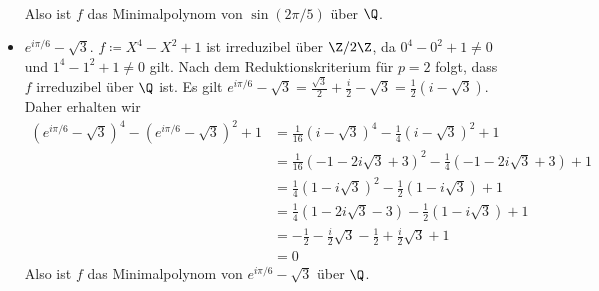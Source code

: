 \documentclass{article}
\begin{document}
\begin{itemize}
\begin{align*}
        \end{align*}
        Also ist $f$ das Minimalpolynom von $\sin(2\pi /5)$ über $\Q$.
        \item $e^{i\pi/6} - \sqrt{3}$. 
        $f \coloneqq X^4 - X^2 + 1$ ist irreduzibel über $\Z/2\Z$, da $0^4 - 0^2 + 1 \neq 0$ und $1^4 - 1^2 + 1 \neq 0$ gilt.
        Nach dem Reduktionskriterium für $p = 2$ folgt, dass $f$ irreduzibel über $\Q$ ist.
        Es gilt $e^{i\pi /6} - \sqrt{3} = \frac{\sqrt{3}}{2} + \frac{i}{2} - \sqrt{3} = \frac{1}{2}(i - \sqrt{3})$.
        Daher erhalten wir
        \begin{align*}
            (e^{i\pi /6} - \sqrt{3})^4  - (e^{i\pi /6} - \sqrt{3})^2 + 1 &= \frac{1}{16}(i - \sqrt{3})^4 - \frac{1}{4}(i - \sqrt{3})^2 + 1\\
            &= \frac{1}{16}(-1 - 2i\sqrt{3} + 3)^2 - \frac{1}{4}(-1 - 2i\sqrt{3} + 3) + 1\\
            &= \frac{1}{4}(1 - i\sqrt{3})^2 - \frac{1}{2}(1- i \sqrt{3}) + 1\\
            &= \frac{1}{4}(1 - 2i\sqrt{3} -3) - \frac{1}{2}(1 - i\sqrt{3}) + 1\\
            &= - \frac{1}{2} - \frac{i}{2}\sqrt{3} - \frac{1}{2} + \frac{i}{2}\sqrt{3} + 1\\
            &= 0
        \end{align*}
        Also ist $f$ das Minimalpolynom von $e^{i\pi /6} - \sqrt{3}$ über $\Q$.
    \end{itemize}
\end{document}
